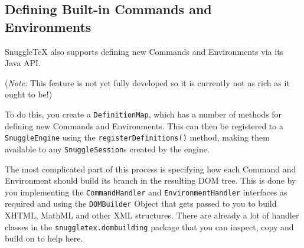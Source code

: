 \subsection*{Defining Built-in Commands and Environments}

SnuggleTeX also supports defining new Commands and Environments via its Java API.

(\emph{Note:} This feature is not yet fully developed so it is currently not as
rich as it ought to be!)

To do this, you create a \verb|DefinitionMap|, which has a number of methods for
defining new Commands and Environments. This can then be registered to a \verb|SnuggleEngine|
using the \verb|registerDefinitions()| method, making them available to any \verb|SnuggleSession|s
created by the engine.

The most complicated part of this process is specifying how each Command and
Environment should build its branch in the resulting DOM tree. This is done
by you implementing the \verb|CommandHandler| and \verb|EnvironmentHandler| interfaces
as required and using the \verb|DOMBuilder| Object that gets passed
to you to build XHTML, MathML and other XML structures. There are already a lot
of handler classes in the \verb|snuggletex.dombuilding| package that you can
inspect, copy and build on to help here.
